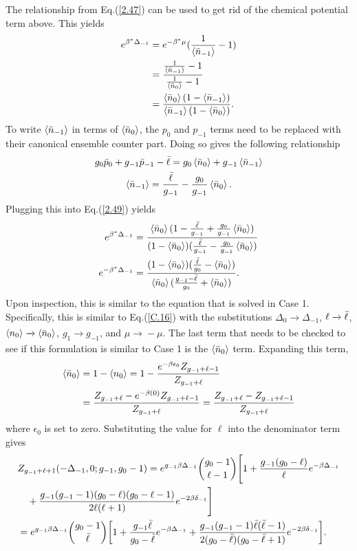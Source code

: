 The relationship from Eq.\@ (\ref{2.47}) can be used to get rid of the chemical potential term above. This yields
\begin{align}
    e^{\beta^*\Delta_{-1}}&=e^{-\beta^*\mu}(\frac{1}{\left<{\Bar{n}_{-1}}\right>}-1)\nonumber\\
    &=\frac{\frac{1}{\left<{\Bar{n}_{-1}}\right>}-1}{\frac{1}{\left<{\Bar{n}_0}\right>}-1}\nonumber\\
    &=\frac{\left<{\Bar{n}_0}\right>(1-\left<{\Bar{n}_{-1}}\right>)}{\left<{\Bar{n}_{-1}}\right>(1-\left<{\Bar{n}_0}\right>)}.
\end{align}
To write $\left<{\Bar{n}_{-1}}\right>$ in terms of $\left<{\Bar{n}_0}\right>$, the $p_0$ and $p_{-1}$ terms  need to be replaced with their canonical ensemble counter part. Doing so gives the following relationship
\begin{gather}
    g_0\Bar{p}_0+g_{-1}\Bar{p}_{-1}-\Bar{\ell}=g_0\left<{\Bar{n}_0}\right>+g_{-1}\left<{\Bar{n}_{-1}}\right>\\
    \left<{\Bar{n}_{-1}}\right>=\frac{\Bar{\ell}}{g_{-1}}-\frac{g_0}{g_{-1}}\left<{\Bar{n}_0}\right>.
\end{gather}
Plugging this into Eq.\@ (\ref{2.49}) yields
\begin{align}
    e^{\beta^*\Delta_{-1}}&=\frac{\left<{\Bar{n}_0}\right>(1-\frac{\Bar{\ell}}{g_{-1}}+\frac{g_0}{g_{-1}}\left<{\Bar{n}_0}\right>)}{(1-\left<{\Bar{n}_0}\right>)(\frac{\Bar{\ell}}{g_{-1}}-\frac{g_0}{g_{-1}}\left<{\Bar{n}_0}\right>)}\\
    e^{-\beta^*\Delta_{-1}}&=\frac{(1-\left<{\Bar{n}_0}\right>)(\frac{\Bar{\ell}}{g_0}-\left<{\Bar{n}_0}\right>)}{\left<{\Bar{n}_0}\right>(\frac{g_{-1}-\Bar{\ell}}{g_0}+\left<{\Bar{n}_0}\right>)}.
\end{align}
Upon inspection, this is similar to the equation that is solved in Case 1. Specifically, this is similar to Eq.\@ (\ref{C.16}) with the substitutions $\Delta_0\xrightarrow[]{}\Delta_{-1}$, $\ell\xrightarrow[]{}\Bar{\ell}$, $\left<{n_0}\right>\xrightarrow[]{}\left<{\Bar{n}_0}\right>$, $g_1\xrightarrow[]{}g_{-1}$, and $\mu \xrightarrow[]{}-\mu$. The last term that needs to be checked to see if this formulation is similar to Case 1 is the $\left<{\Bar{n}_0}\right>$ term. Expanding this term, 
\begin{align}
    \left<{\Bar{n}_0}\right>&=1-\left<{n_0}\right>=1-\frac{e^{-\beta\epsilon_0}Z_{g_{-1}+\ell-1}}{Z_{g_{-1}+\ell}}\\
    &=\frac{Z_{g_{-1}+\ell}-e^{-\beta (0)}Z_{g_{-1}+\ell-1}}{Z_{g_{-1}+\ell}}=\frac{Z_{g_{-1}+\ell}-Z_{g_{-1}+\ell-1}}{Z_{g_{-1}+\ell}} \label{2.56}
\end{align}
where $\epsilon_0$ is set to zero. Substituting the value for $\ell$ into the denominator term gives
\begin{align}
    &Z_{g_{-1}+\ell+1}(-\Delta_{-1},0;g_{-1},g_0-1)=e^{g_{-1}\beta\Delta_{-1}}{g_0-1 \choose \ell-1}\Biggr[1+\frac{g_{-1}(g_0-\ell)}{\ell}e^{-\beta\Delta_{-1}}\nonumber\\
    &\quad+\frac{g_{-1}(g_{-1}-1)(g_0-\ell)(g_0-\ell-1)}{2\ell(\ell+1)}e^{-2\beta\delta_{-1}}\Biggr]\nonumber\\
    &=e^{g_{-1}\beta\Delta_{-1}}{g_0-1 \choose \Bar{\ell}}\qty[1+\frac{g_{-1}\Bar{\ell}}{g_0-\bar{\ell}}e^{-\beta\Delta_{-1}}+\frac{g_{-1}(g_{-1}-1)\Bar{\ell}(\Bar{\ell}-1)}{2(g_0-\Bar{\ell})(g_0-\Bar{\ell}+1)}e^{-2\beta\delta_{-1}}].
\end{align}
